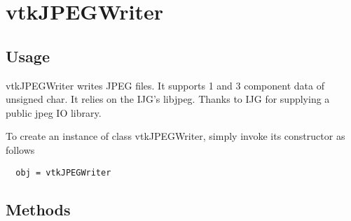 \section{vtkJPEGWriter}

\subsection{Usage}

 vtkJPEGWriter writes JPEG files. It supports 1 and 3 component data of
 unsigned char. It relies on the IJG's libjpeg.  Thanks to IJG for
 supplying a public jpeg IO library.

To create an instance of class vtkJPEGWriter, simply
invoke its constructor as follows
\begin{verbatim}
  obj = vtkJPEGWriter
\end{verbatim}
\subsection{Methods}

